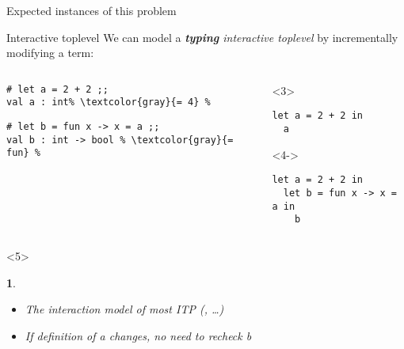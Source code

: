 \documentclass{beamer}
\theoremstyle{example}
\newtheorem{remarks}[theorem]{\translate{Remarks}}
\begin{document}
\begin{frame}[fragile]{Expected instances of this problem}
  \begin{block}{Interactive toplevel}
    We can model a \emph{\textbf{typing} interactive toplevel} by
    incrementally modifying a term:
    \begin{overlayarea}{\textwidth}{10em}
    \begin{columns}
      \begin{column}{0.47\textwidth}
        \begin{lstlisting}[escapechar=\%]
# let a = 2 + 2 ;;
val a : int% \textcolor{gray}{= 4} %
        \end{lstlisting}
\pause
        \begin{lstlisting}[escapechar=\%]
# let b = fun x -> x = a ;;
val b : int -> bool % \textcolor{gray}{= fun} %
        \end{lstlisting}
      \end{column}
      \begin{column}{.1mm}
        \rule{.1mm}{3cm}
      \end{column}
      \begin{column}{0.44\textwidth}
        \begin{onlyenv}<3>
          \begin{lstlisting}
let a = 2 + 2 in
  a
          \end{lstlisting}
          \vspace{1.2em}
        \end{onlyenv}
        \begin{onlyenv}<4->
          \begin{lstlisting}
let a = 2 + 2 in
  let b = fun x -> x = a in
    b
          \end{lstlisting}
        \end{onlyenv}
      \end{column}
    \end{columns}
    \end{overlayarea}
    \begin{visibleenv}<5>
      \begin{remarks}
        \begin{itemize}
        \item The interaction model of most ITP (,
          \ldots)
        \item If definition of \textsf{a} changes, no need to recheck \textsf{b}
        \end{itemize}
      \end{remarks}
    \end{visibleenv}
  \end{block}
\end{frame}
\end{document}
